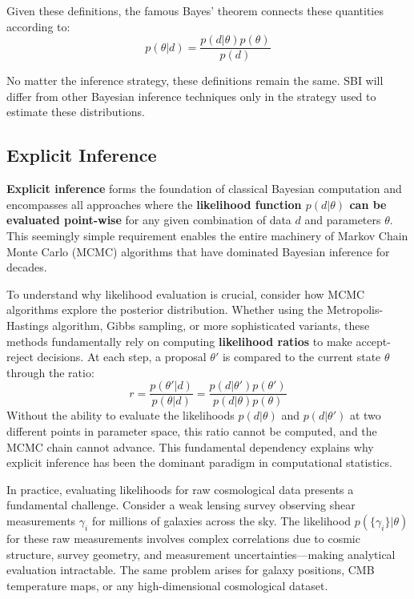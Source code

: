 \documentclass{SciPost}
\begin{document}
Given these definitions, the famous Bayes' theorem connects these quantities according to:
\begin{equation}
    \boxed{p(\theta|d) = \frac{p(d|\theta)p(\theta)}{p(d)}}
\end{equation}

No matter the inference strategy, these definitions remain the same. SBI will differ from other Bayesian inference techniques only in the strategy used to estimate these distributions. 

\subsection{Explicit Inference}

\textbf{Explicit inference} forms the foundation of classical Bayesian computation and encompasses all approaches where the \textbf{likelihood function $p(d|\theta)$ can be evaluated point-wise} for any given combination of data $d$ and parameters $\theta$. This seemingly simple requirement enables the entire machinery of Markov Chain Monte Carlo (MCMC) algorithms that have dominated Bayesian inference for decades.

To understand why likelihood evaluation is crucial, consider how MCMC algorithms explore the posterior distribution. Whether using the Metropolis-Hastings algorithm, Gibbs sampling, or more sophisticated variants, these methods fundamentally rely on computing \textbf{likelihood ratios} to make accept-reject decisions. At each step, a proposal $\theta'$ is compared to the current state $\theta$ through the ratio:
\begin{equation}
    r = \frac{p(\theta'|d)}{p(\theta|d)} = \frac{p(d|\theta')p(\theta')}{p(d|\theta)p(\theta)}
\end{equation}
Without the ability to evaluate the likelihoods $p(d|\theta)$ and $p(d|\theta')$ at two different points in parameter space, this ratio cannot be computed, and the MCMC chain cannot advance. This fundamental dependency explains why explicit inference has been the dominant paradigm in computational statistics.

In practice, evaluating likelihoods for raw cosmological data presents a fundamental challenge. Consider a weak lensing survey observing shear measurements $\gamma_{i}$ for millions of galaxies across the sky. The likelihood $p(\{\gamma_i\}|\theta)$ for these raw measurements involves complex correlations due to cosmic structure, survey geometry, and measurement uncertainties—making analytical evaluation intractable. The same problem arises for galaxy positions, CMB temperature maps, or any high-dimensional cosmological dataset.
\end{document}
